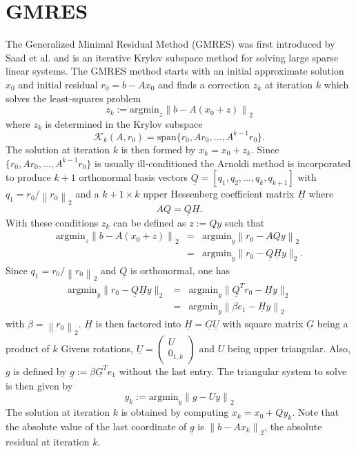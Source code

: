 \documentclass{scrartcl}
\numberwithin{equation}{section}
\newcommand{\norm}[1]{\left\lVert#1\right\rVert}
\begin{document}
\section{GMRES}
The Generalized Minimal Residual Method (GMRES) was first introduced by Saad et al. \cite{Saad:1986:GGM:14063.14074} and is an iterative Krylov subspace method for solving large sparse linear systems. 
The GMRES method starts with an initial approximate solution $x_0$ and initial residual $r_0 = b - Ax_0$ and finds a correction $z_k$ at iteration $k$ which solves the least-squares problem 
\begin{equation}
	z_k := \text{argmin}_{z} \norm{b - A(x_0 + z)}_2
\end{equation}
where $z_k$ is determined in the Krylov subspace 
\begin{equation*}
	 \mathcal{K}_k(A, r_0) = \text{span}\{r_0, Ar_0, \ldots, A^{k-1}r_0\}.
\end{equation*}
The solution at iteration $k$ is then formed by $x_k = x_0 + z_k$.
Since $\{r_0, Ar_0, \ldots, A^{k-1}r_0\}$ is usually ill-conditioned the Arnoldi method is incorporated to produce $k + 1$ orthonormal basis vectors $\underline{Q} = [q_1, q_2, \ldots, q_k, q_{k + 1}]$ with $q_1 = r_0/\norm{r_0}_2$ and a $k + 1 \times k$ upper Hessenberg coefficient matrix $\underline{H}$ where
\begin{equation*}
	AQ = \underline{Q}\underline{H}.
\end{equation*}
With these conditions $z_k$ can be defined as $z := Qy$ such that 
\begin{eqnarray*}
	\text{argmin}_{z} \norm{b - A(x_0 + z)}_2 &=& \text{argmin}_y \norm{r_0 - AQy}_2 \\
	 &=& \text{argmin}_{y} \lVert r_0 - \underline{Q} \underline{H} y \rVert_2.
\end{eqnarray*}
Since $q_1 = r_0/\norm{r_0}_2$ and $\underline{Q}$ is orthonormal, one has
\begin{eqnarray} \label{eq:stdgmreslsp}
	\text{argmin}_y \lVert r_0 - \underline{Q} \underline{H} y \rVert_2 &=& \text{argmin}_{y} \lVert \underline{Q}^T r_0 - \underline{H} y \rVert_2 \nonumber \\
	&=& \text{argmin}_{y} \norm{\beta e_1 - \underline{H} y}_2 
\end{eqnarray}
with $\beta = \norm{r_0}_2$.
$\underline{H}$ is then factored into $\underline{H} = \underline{G}\underline{U}$ with square matrix $\underline{G}$ being a product of $k$ Givens rotations, $\underline{U} = 
\begin{pmatrix}
	U \\
	0_{1, k}
\end{pmatrix}$
and $U$ being upper triangular. Also, $g$ is defined by $\underline{g} := \beta \underline{G}^T e_1$ without the last entry. The triangular system to solve is then given by
\begin{equation*}
	y_k := \text{argmin}_y \norm{g - U y}_2
\end{equation*}
The solution at iteration $k$ is obtained by computing $x_k = x_0 + Qy_k$. Note that the absolute value of the last coordinate of $\underline{g}$ is $\norm{b - Ax_k}_2$, the absolute residual at iteration $k$.
\end{document}
